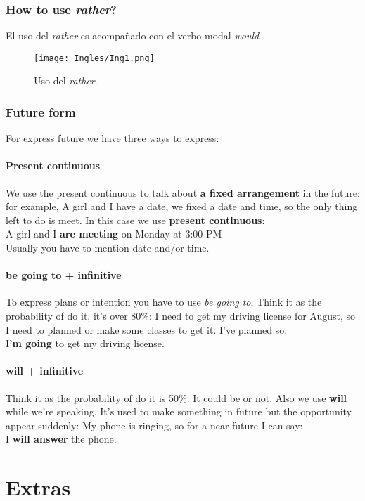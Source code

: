 \documentclass[
	11pt, %
	fleqn, %
	a4paper, %
]{LegrandOrangeBook}
\begin{document}
\section{How to use \textit{rather}?}
El uso del \textit{rather} es acompañado con el verbo modal \textit{would}
\begin{figure}[H]
\centering
\texttt{[image: Ingles/Ing1.png]}
\caption{Uso del \textit{rather}.}
\end{figure}
\section{Future form}
For express future we have three ways to express:
\subsection{Present continuous}
We use the present continuous to talk about \textbf{a fixed arrangement} in the future: for example, A girl and I have a date, we fixed a date and time, so the only thing left to do is meet. In this case we use \textbf{present continuous}:\\
A girl and I \textbf{are meeting} on Monday at 3:00 PM\\
Usually you have to mention date and/or time.
\subsection{be going to + infinitive}
To express plans or intention you have to use \textit{be going to}, Think it as the probability of do it, it's over 80\%: I need to get my driving license for August, so I need to planned or make some classes to get it. I've planned so:\\
I\textbf{'m going} to get my driving license.
\subsection{will + infinitive}
Think it as the probability of do it is 50\%. It could be or not. Also we use \textbf{will} while we're speaking. It's used to make something in future but the opportunity appear suddenly: My phone is ringing, so for a near future I can say:\\
I \textbf{will answer} the phone.
\part{Extras}
\end{document}
